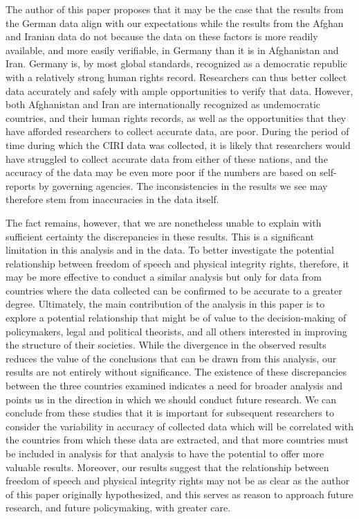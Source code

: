 \documentclass{article}
\begin{document}
The author of this paper proposes that it may be the case that the results from the German data align with our expectations while the results from the Afghan and Iranian data do not because the data on these factors is more readily available, and more easily verifiable, in Germany than it is in Afghanistan and Iran. Germany is, by most global standards, recognized as a democratic republic with a relatively strong human rights record. Researchers can thus better collect data accurately and safely with ample opportunities to verify that data. However, both Afghanistan and Iran are internationally recognized as undemocratic countries, and their human rights records, as well as the opportunities that they have afforded researchers to collect accurate data, are poor. During the period of time during which the CIRI data was collected, it is likely that researchers would have struggled to collect accurate data from either of these nations, and the accuracy of the data may be even more poor if the numbers are based on self-reports by governing agencies. The inconsistencies in the results we see may therefore stem from inaccuracies in the data itself.

The fact remains, however, that we are nonetheless unable to explain with sufficient certainty the discrepancies in these results. This is a significant limitation in this analysis and in the data. To better investigate the potential relationship between freedom of speech and physical integrity rights, therefore, it may be more effective to conduct a similar analysis but only for data from countries where the data collected can be confirmed to be accurate to a greater degree.
Ultimately, the main contribution of the analysis in this paper is to explore a potential relationship that might be of value to the decision-making of policymakers, legal and political theorists, and all others interested in improving the structure of their societies. While the divergence in the observed results reduces the value of the conclusions that can be drawn from this analysis, our results are not entirely without significance. The existence of these discrepancies between the three countries examined indicates a need for broader analysis and points us in the direction in which we should conduct future research. We can conclude from these studies that it is important for subsequent researchers to consider the variability in accuracy of collected data which will be correlated with the countries from which these data are extracted, and that more countries must be included in analysis for that analysis to have the potential to offer more valuable results. Moreover, our results suggest that the relationship between freedom of speech and physical integrity rights may not be as clear as the author of this paper originally hypothesized, and this serves as reason to approach future research, and future policymaking, with greater care. 
\end{document}
